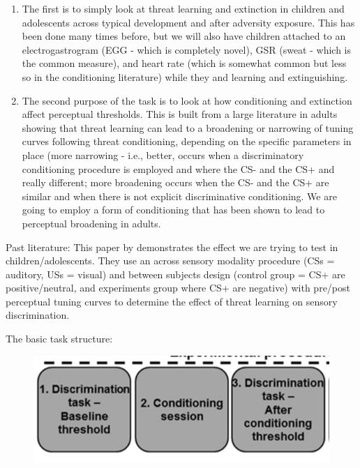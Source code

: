 \documentclass[]{book}
\providecommand{\tightlist}{%
  \setlength{\itemsep}{0pt}\setlength{\parskip}{0pt}}
\begin{document}
\begin{enumerate}
\def\labelenumi{\arabic{enumi}.}
\tightlist
\item
  The first is to simply look at threat learning and extinction in children and adolescents across typical development and after adversity exposure. This has been done many times before, but we will also have children attached to an electrogastrogram (EGG - which is completely novel), GSR (sweat - which is the common measure), and heart rate (which is somewhat common but less so in the conditioning literature) while they and learning and extinguishing.
\item
  The second purpose of the task is to look at how conditioning and extinction affect perceptual thresholds. This is built from a large literature in adults showing that threat learning can lead to a broadening or narrowing of tuning curves following threat conditioning, depending on the specific parameters in place (more narrowing - i.e., better, occurs when a discriminatory conditioning procedure is employed and where the CS- and the CS+ and really different; more broadening occurs when the CS- and the CS+ are similar and when there is not explicit discriminative conditioning. We are going to employ a form of conditioning that has been shown to lead to perceptual broadening in adults.
\end{enumerate}

Past literature:
This paper by \citet{shalev_2018} demonstrates the effect we are trying to test in children/adolescents. They use an across sensory modality procedure (CSs = auditory, USs = visual) and between subjects design (control group = CS+ are positive/neutral, and experiments group where CS+ are negative) with pre/post perceptual tuning curves to determine the effect of threat learning on sensory discrimination.

The basic task structure:

\begin{figure}
\centering
\includegraphics{images/information/measures/tasks/disc_cond_ext/1.png}
\caption{}
\end{figure}
\end{document}
